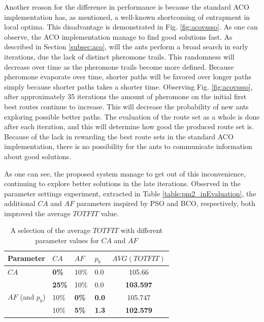 Another reason for the difference in performance is because the standard ACO implementation has, as mentioned, a well-known shortcoming of entrapment in local optima. This disadvantage is demonstrated in Fig. \ref{fig:acovssso}. As one can observe, the ACO implementation manage to find good solutions fast. As described in Section \vref{subsec:aco}, will the ants perform a broad search in early iterations, due the lack of distinct pheromone trails. This randomness will decrease over time as the pheromone trails become more defined. Because pheromone evaporate over time, shorter paths will be favored over longer paths simply because shorter paths takes a shorter time. Observing Fig. \ref{fig:acovssso}, after approximately 35 iterations the amount of pheromone on the initial first best routes continue to increase. This will decrease the probability of new ants exploring possible better paths. The evaluation of the route set as a whole is done after each iteration, and this will determine how good the produced route set is. Because of the lack in rewarding the best route sets in the standard ACO implementation, there is no possibility for the ants to communicate information about good solutions.

As one can see, the proposed system manage to get out of this inconvenience, continuing to explore better solutions in the late iterations. Observed in the parameter settings experiment, extracted in Table \vref{table:pm2_inEvaluation}, the additional $CA$ and $AF$ parameters inspired by PSO and BCO, respectively, both improved the average $TOTFIT$ value. 

\begin{table}
    \centering
    \begin{tabular}{|l|l|l|l|c|}
    \hline
    Parameter & $CA$ & $AF$ & $p_b$ & $AVG(TOTFIT)$ \\
    \hline
    $CA$ & \textbf{0\%} & 10\% & 0.0 & 105.66\\
    ~ & \textbf{25\%} & 10\% & 0.0 & \textbf{103.597}\\
    \hline
    $AF$ (and $p_b$) & 10\% & \textbf{0\%} & \textbf{0.0} & 105.747 \\
    ~ & 10\% & \textbf{5\%} & \textbf{1.3} & \textbf{102.579}\\
    \hline
    \end{tabular}
    \caption {A selection of the average $TOTFIT$ with different parameter values for $CA$ and $AF$}
    \label{table:pm2_inEvaluation}
\end{table}


